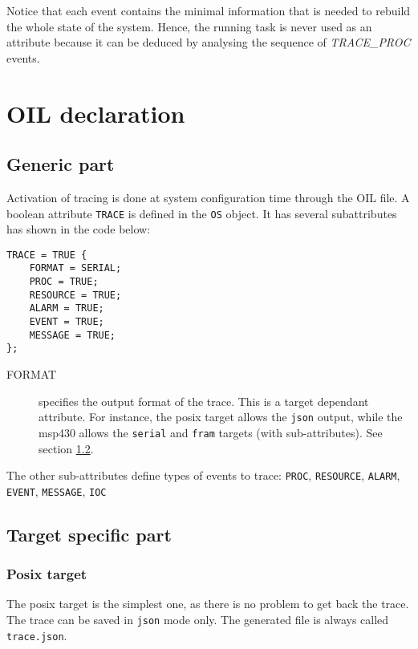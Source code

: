 Notice that each event contains the minimal information that is needed
to rebuild the whole state of the system.
Hence, the running task is never used as an attribute because it can be deduced
by analysing the sequence of \emph{TRACE\_PROC} events.

\section{OIL declaration}
\subsection{Generic part}

Activation of tracing is done at system configuration time through the OIL file.
A boolean attribute \texttt{TRACE} is defined in the \texttt{OS} object. It has
several subattributes has shown in the code below:

\begin{lstlisting}[language=OIL]
TRACE = TRUE {
    FORMAT = SERIAL;
    PROC = TRUE;
    RESOURCE = TRUE;
    ALARM = TRUE;
    EVENT = TRUE;
    MESSAGE = TRUE;
};
\end{lstlisting}

\begin{description}
	\item[FORMAT] specifies the output format of the trace. This is a target dependant attribute. For instance, the posix target allows the \texttt{json} output, while the msp430 allows the \texttt{serial} and \texttt{fram} targets (with sub-attributes). See section \ref{sec:traceTargetFormat}.

\end{description}
The other sub-attributes define types of events to trace: \texttt{PROC}, \texttt{RESOURCE}, \texttt{ALARM}, \texttt{EVENT}, \texttt{MESSAGE}, \texttt{IOC}

\subsection{Target specific part}
\label{sec:traceTargetFormat}
\subsubsection{Posix target}
The posix target is the simplest one, as there is no problem to get back the trace. The trace can be saved in \texttt{json} mode only. The generated file is always called \texttt{trace.json}.


